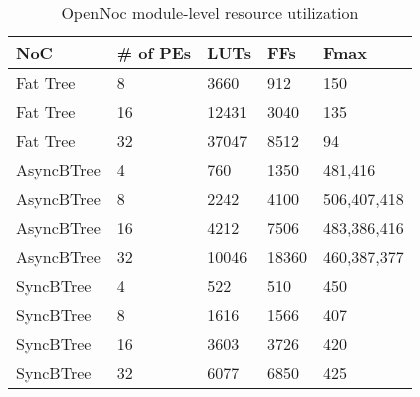 \begin{table}[!t]
  \centering
  \caption{OpenNoc module-level resource utilization} 
  \begin{tabular}{l|l|l|l|l}
      \toprule
      NoC & \# of PEs & LUTs & FFs & Fmax \\
      \midrule
      \midrule
      Fat Tree & 8      & 3660 & 912 & 150   \\
      Fat Tree & 16     & 12431 & 3040 & 135 \\
      Fat Tree & 32     & 37047 & 8512 & 94  \\    
      \midrule
      AsyncBTree & 4         & 760  & 1350 & 481,416\\
      AsyncBTree & 8         & 2242 & 4100 & 506,407,418\\
      AsyncBTree & 16        & 4212 & 7506 & 483,386,416 \\
      AsyncBTree & 32        & 10046 & 18360 & 460,387,377\\
      \midrule
      SyncBTree  &  4         &  522 & 510 & 450\\
      SyncBTree  &  8         &  1616 & 1566 & 407\\
      SyncBTree  &  16        &  3603 & 3726 & 420\\
      SyncBTree  &  32        &  6077 & 6850 & 425\\
      \bottomrule
    \end{tabular}
	\label{table:systemResourceConsumption}
\end{table}